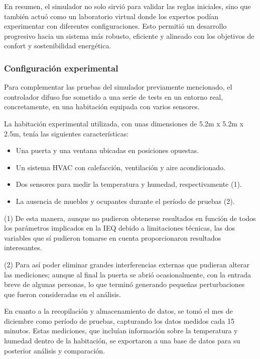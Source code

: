 En resumen, el simulador no solo sirvió para validar las reglas iniciales, sino que también actuó como un laboratorio virtual donde los expertos podían experimentar con diferentes configuraciones. Esto permitió un desarrollo progresivo hacia un sistema más robusto, eficiente y alineado con los objetivos de confort y sostenibilidad energética.

\subsubsection{Configuración experimental}

Para complementar las pruebas del simulador previamente mencionado, el controlador difuso fue sometido a una serie de tests en un entorno real, concretamente, en una habitación equipada con varios sensores.

La habitación experimental utilizada, con unas dimensiones de 5.2m x 5.2m x 2.5m, tenía las siguientes características:
\begin{itemize}
	\item Una puerta y una ventana ubicadas en posiciones opuestas.
	\item Un sistema HVAC con calefacción, ventilación y aire acondicionado.
	\item Dos sensores para medir la temperatura y humedad, respectivamente (1).
	\item La ausencia de muebles y ocupantes durante el período de pruebas (2).
\end{itemize}

(1) De esta manera, aunque no pudieron obtenerse resultados en función de todos los parámetros implicados en la IEQ debido a limitaciones técnicas, las dos variables que sí pudieron tomarse en cuenta proporcionaron resultados interesantes.

(2) Para así poder eliminar grandes interferencias externas que pudieran alterar las mediciones; aunque al final la puerta se abrió ocasionalmente, con la entrada breve de algunas personas, lo que terminó generando pequeñas perturbaciones que fueron consideradas en el análisis.

\vspace{0.4cm}

En cuanto a la recopilación y almacenamiento de datos, se tomó el mes de diciembre como período de pruebas, capturando los datos medidos cada 15 minutos. Estas mediciones, que incluían información sobre la temperatura y humedad dentro de la habitación, se exportaron a una base de datos para su posterior análisis y comparación.

